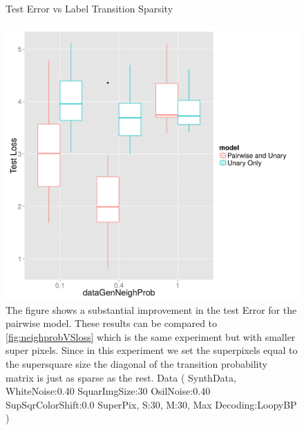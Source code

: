 \begin{figure}
\centering
\caption{Test Error vs Label Transition Sparsity}
\includegraphics[width=1.0\textwidth]{images/neighProb_s_equals_supSquare.png}
\caption{ The figure shows a substantial improvement in the test Error for the pairwise model. These results can be compared to \ref{fig:neighprobVSloss} which is the same experiment but with smaller super pixels. Since in this experiment we set the superpixels equal to the supersquare size the diagonal of the transition probability matrix is just as sparse as the rest.  Data ( SynthData, WhiteNoise:0.40 SquarImgSize:30 OsilNoise:0.40 SupSqrColorShift:0.0 SuperPix, S:30, M:30, Max Decoding:LoopyBP ) }
\label{fig:s_equals_superSquare}
\end{figure}


